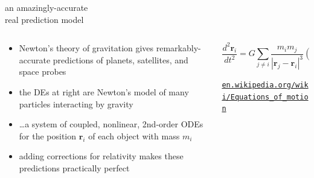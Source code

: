 \documentclass{beamer}
\begin{document}
\begin{frame}{an amazingly-accurate \\ real prediction model}

\begin{columns}
\begin{column}{0.55\textwidth}
\begin{itemize}
\item Newton's theory of gravitation gives remarkably-accurate predictions of planets, satellites, and space probes
\item the DEs at right are Newton's model of many particles interacting by gravity
\item \dots a system of coupled, nonlinear, 2nd-order ODEs for the position $\mathbf{r}_i$ of each object with mass $m_i$
\item adding corrections for relativity makes these predictions practically perfect
\end{itemize}
\end{column}
\begin{column}{0.45\textwidth}
$$\frac{d^2 \mathbf{r}_i}{dt^2} = G \sum_{j\ne i} \frac{m_i m_j}{|\mathbf{r}_j - \mathbf{r}_i|^3} (\mathbf{r}_j - \mathbf{r}_i)$$

\medskip

\quad \tiny \href{https://en.wikipedia.org/wiki/Equations_of_motion}{\texttt{en.wikipedia.org/wiki/Equations\_of\_motion}}
\end{column}
\end{columns}
\end{frame}
\end{document}
